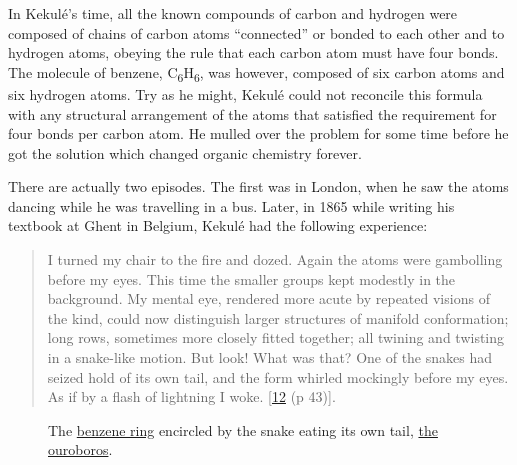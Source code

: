 \documentclass[
  a4paper,
]{article}
\begin{document}
In Kekulé's time, all the known compounds of carbon and hydrogen were
composed of chains of carbon atoms ``connected'' or bonded to each other
and to hydrogen atoms, obeying the rule that each carbon atom must have
four bonds. The molecule of benzene,
C\textsubscript{6}H\textsubscript{6}, was however, composed of six
carbon atoms and six hydrogen atoms. Try as he might, Kekulé could not
reconcile this formula with any structural arrangement of the atoms that
satisfied the requirement for four bonds per carbon atom. He mulled over
the problem for some time before he got the solution which changed
organic chemistry forever.

There are actually two episodes. The first was in London, when he saw
the atoms dancing while he was travelling in a bus. Later, in 1865 while
writing his textbook at Ghent in Belgium, Kekulé had the following
experience:

\begin{quote}
I turned my chair to the fire and dozed. Again the atoms were gambolling
before my eyes. This time the smaller groups kept modestly in the
background. My mental eye, rendered more acute by repeated visions of
the kind, could now distinguish larger structures of manifold
conformation; long rows, sometimes more closely fitted together; all
twining and twisting in a snake-like motion. But look! What was that?
One of the snakes had seized hold of its own tail, and the form whirled
mockingly before my eyes. As if by a flash of lightning I woke.
{[}\protect\hyperlink{ref-findlay37}{12} (p 43){]}.
\end{quote}

\begin{figure}
\hypertarget{fig:benzene}{%
\centering

\caption[The
\href{https://en.wikipedia.org/wiki/Benzene\#Structure}{benzene ring}
encircled by the snake eating its own tail,
\href{https://en.wikipedia.org/wiki/Ouroboros}{the ouroboros}.]{The
\href{https://en.wikipedia.org/wiki/Benzene\#Structure}{benzene ring}
encircled by the snake eating its own tail,
\href{https://en.wikipedia.org/wiki/Ouroboros}{the
ouroboros}.\footnotemark{}}\label{fig:benzene}
}
\end{figure}
\end{document}
